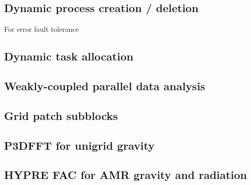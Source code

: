 \documentclass{article}
\begin{document}
\subsection{Dynamic process creation / deletion} \label{solution:parallel-dynamic-procs}

   For error fault tolerance

\subsection{Dynamic task allocation} \label{solution:parallel-dynamic-tasks}


\subsection{Weakly-coupled parallel data analysis}\label{solution:parallel-data-analysis}


\subsection{Grid patch subblocks} \label{solution:parallel-subblocks}


\subsection{P3DFFT for unigrid gravity} \label{solution:method-p3dfft}


\subsection{HYPRE FAC for AMR gravity and radiation}  \label{solution:method-hypre-fac}
\end{document}

